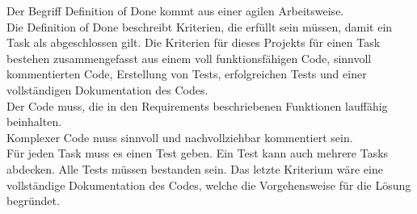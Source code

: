 Der Begriff Definition of Done kommt aus einer agilen Arbeitsweise.\\
Die Definition of Done beschreibt Kriterien, die erfüllt sein müssen, damit ein Task als abgeschlossen gilt.
Die Kriterien für dieses Projekts für einen Task bestehen zusammengefasst aus einem voll funktionsfähigen Code, sinnvoll kommentierten Code, Erstellung von Tests, erfolgreichen Tests und einer vollständigen Dokumentation des Codes.\\
Der Code muss, die in den Requirements beschriebenen Funktionen lauffähig beinhalten.\\
Komplexer Code muss sinnvoll und nachvollziehbar kommentiert sein.\\
Für jeden Task muss es einen Test geben.
Ein Test kann auch mehrere Tasks abdecken. Alle Tests müssen bestanden sein.
Das letzte Kriterium wäre eine vollständige Dokumentation des Codes, welche die Vorgehensweise für die Lösung begründet.